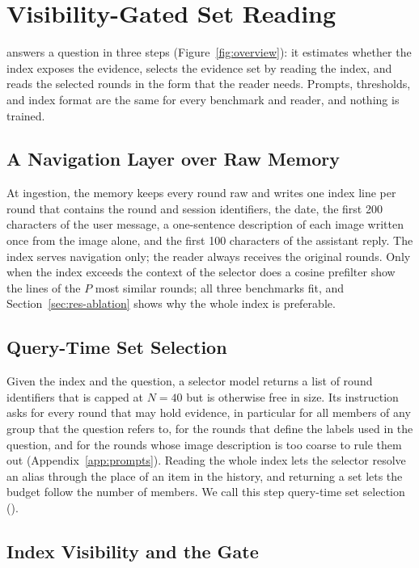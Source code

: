 \section{Visibility-Gated Set Reading}
\label{sec:method}

\vgs{} answers a question in three steps (Figure~\ref{fig:overview}): it estimates whether the index exposes the evidence, selects the evidence set by reading the index, and reads the selected rounds in the form that the reader needs. Prompts, thresholds, and index format are the same for every benchmark and reader, and nothing is trained.

\subsection{A Navigation Layer over Raw Memory}
\label{sec:index}

At ingestion, the memory keeps every round raw and writes one index line per round that contains the round and session identifiers, the date, the first 200 characters of the user message, a one-sentence description of each image written once from the image alone, and the first 100 characters of the assistant reply. The index serves navigation only; the reader always receives the original rounds. Only when the index exceeds the context of the selector does a cosine prefilter show the lines of the $P$ most similar rounds; all three benchmarks fit, and Section~\ref{sec:res-ablation} shows why the whole index is preferable.

\subsection{Query-Time Set Selection}
\label{sec:select}

Given the index and the question, a selector model returns a list of round identifiers that is capped at $N{=}40$ but is otherwise free in size. Its instruction asks for every round that may hold evidence, in particular for all members of any group that the question refers to, for the rounds that define the labels used in the question, and for the rounds whose image description is too coarse to rule them out (Appendix~\ref{app:prompts}). Reading the whole index lets the selector resolve an alias through the place of an item in the history, and returning a set lets the budget follow the number of members. We call this step query-time set selection (\qss{}).

\subsection{Index Visibility and the Gate}
\label{sec:gate}

